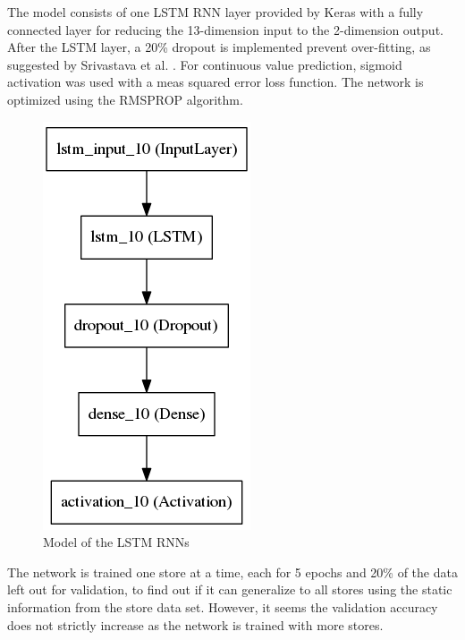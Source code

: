 \documentclass[DIV=calc, paper=a4, fontsize=11pt, twocolumn]{scrartcl}
\begin{document}
The model consists of one LSTM RNN layer provided by Keras with a fully connected layer for reducing the 13-dimension input to the 2-dimension output. After the LSTM layer, a 20\% dropout is implemented prevent over-fitting, as suggested by Srivastava et al. \cite{srivastava14-dropout}. For continuous value prediction, sigmoid activation was used with a meas squared error loss function. The network is optimized using the RMSPROP algorithm.
\begin{figure}[H]
    \centering
    \includegraphics[width=0.7\linewidth]{model}
    \caption{Model of the LSTM RNNs}
    \label{fig_model}
	\end{figure}

The network is trained one store at a time, each for 5 epochs and 20\% of the data left out for validation, to find out if it can generalize to all stores using the static information from the store data set. However, it seems the validation accuracy does not strictly increase as the network is trained with more stores.
\end{document}
